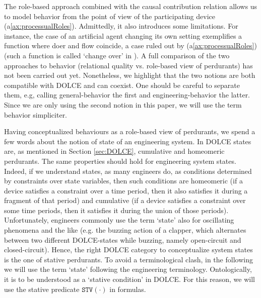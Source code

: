 \documentclass[sw]{iosart2x}
\newcommand{\AxLabel}{\textrm{a}}
\newcommand{\refax}[1]{({\AxLabel}\ref{#1})}
\newcommand{\generalStyle}[1]{\texttt{#1}}
\newcommand{\uniRel}[2]{\generalStyle{#1}(#2)}
\newcommand{\DOLCE}{\textsc{DOLCE}\xspace} %
\newcommand{\DOLCEStative}[1]{\uniRel{{STV}}{#1}}
\newcommand{\quotes}[1]{`#1'}
\begin{document}
The role-based approach combined with the causal contribution relation allows us to model behavior from the point of view of the participating device 
\refax{ax:processualRoles}. Admittedly, it also introduces some limitations. For instance, the case of an artificial agent changing its own setting exemplifies a function where doer and flow coincide, a case ruled out by \refax{ax:processualRoles} (such a function is called `change over' in \cite{borgoKnowledgebasedAdaptiveAgents2019}).\marginpar{\color{red}{frase aggiunta}}
A full comparison of the two approaches to behavior (relational quality vs. role-based view of perdurants)
has not been carried out yet. Nonetheless, we highlight that the two notions are both compatible with \DOLCE and can coexist. One should be careful to separate them, e.g, calling general-behavior the first and engineering-behavior the latter. Since we are only using the second notion in this paper, we will use the term behavior simpliciter.


Having conceptualized behaviours as a role-based view of perdurants, we spend a few words about the notion of state of an engineering system.
In \DOLCE states are, as mentioned in Section \ref{sec:DOLCE}, cumulative and homeomeric perdurants.
The same properties should hold for engineering system states.
Indeed, if we understand states, as many engineers do, as conditions determined by constraints over state variables, then such conditions are homeomeric (if a device satisfies a constraint over a time period, then it also satisfies it during a fragment of that period) and cumulative (if a device satisfies a constraint over some time periods, then it satisfies it during the union of those periods).
Unfortunately, engineers commonly use the term \quotes{state} also for oscillating phenomena and the like (e.g. the buzzing action of a clapper, which alternates between two different \DOLCE-states while buzzing, namely open-circuit and closed-circuit). 
Hence, the right \DOLCE category to conceptualize system states is the one of stative perdurants. 
To avoid a terminological clash, in the following we will use the term \quotes{state} following the engineering terminology. Ontologically, it is to be understood as a \quotes{stative condition} in \DOLCE. For this reason, we will use the stative predicate $\DOLCEStative{\cdot}$ in formulas.
\end{document}
